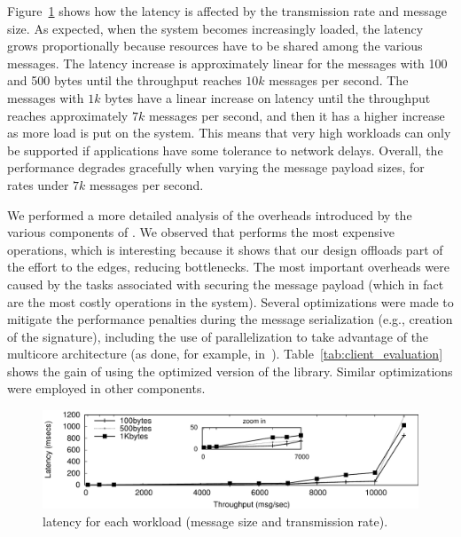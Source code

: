 Figure~\ref{fig:lat_vs_throu} shows how the latency is affected by the transmission rate and message size.
As expected, when the system becomes increasingly loaded, the latency grows proportionally because resources have to be shared among the various messages.
The latency increase is approximately linear for the messages with 100 and 500 bytes until the throughput reaches $10k$ messages per second.
The messages with $1k$ bytes have a linear increase on latency until the throughput reaches approximately $7k$ messages per second, and then it has a higher increase as more load is put on the system.
This means that very high workloads can only be supported if applications have some tolerance to network delays.
Overall, the performance degrades gracefully when varying the message payload sizes, for rates under $7k$ messages per second.

We performed a more detailed analysis of the overheads introduced by the various components of \sieveq.
We observed that \sender performs the most expensive operations, which is interesting because it shows that our design offloads part of the effort to the edges, reducing bottlenecks.
The most important overheads were caused by the tasks associated with securing the message payload (which in fact are the most costly operations in the system). Several optimizations were made to mitigate the performance penalties during the message serialization (e.g., creation of the signature), including the use of parallelization to take advantage of the multicore architecture (as done, for example, in~\cite{Kirsch:2014}).
Table~\ref{tab:client_evaluation} shows the gain of using the optimized version of the \sender library. Similar optimizations were employed in other components.


\begin{figure}[!t]
\centering
\includegraphics[width=\columnwidth]{images/gnuplot/sieveq/new_plot_latencyvsthroughput/latencyVSthroughput.pdf}
\caption{\small \sieveq latency for each workload (message size and transmission rate).}
\label{fig:lat_vs_throu}
\end{figure}

